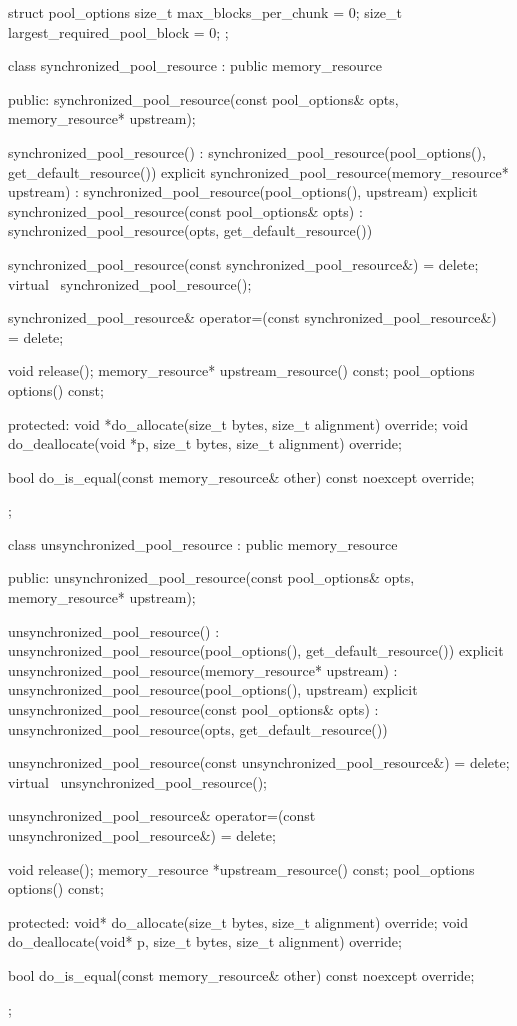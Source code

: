 %
%
%
\begin{codeblock}
struct pool_options {
  size_t max_blocks_per_chunk = 0;
  size_t largest_required_pool_block = 0;
};

class synchronized_pool_resource : public memory_resource {
public:
  synchronized_pool_resource(const pool_options& opts,
                             memory_resource* upstream);

  synchronized_pool_resource()
      : synchronized_pool_resource(pool_options(), get_default_resource()) {}
  explicit synchronized_pool_resource(memory_resource* upstream)
      : synchronized_pool_resource(pool_options(), upstream) {}
  explicit synchronized_pool_resource(const pool_options& opts)
      : synchronized_pool_resource(opts, get_default_resource()) {}

  synchronized_pool_resource(const synchronized_pool_resource&) = delete;
  virtual ~synchronized_pool_resource();

  synchronized_pool_resource&
    operator=(const synchronized_pool_resource&) = delete;

  void release();
  memory_resource* upstream_resource() const;
  pool_options options() const;

protected:
  void *do_allocate(size_t bytes, size_t alignment) override;
  void do_deallocate(void *p, size_t bytes, size_t alignment) override;

  bool do_is_equal(const memory_resource& other) const noexcept override;
};

class unsynchronized_pool_resource : public memory_resource {
public:
  unsynchronized_pool_resource(const pool_options& opts,
                               memory_resource* upstream);

  unsynchronized_pool_resource()
      : unsynchronized_pool_resource(pool_options(), get_default_resource()) {}
  explicit unsynchronized_pool_resource(memory_resource* upstream)
      : unsynchronized_pool_resource(pool_options(), upstream) {}
  explicit unsynchronized_pool_resource(const pool_options& opts)
      : unsynchronized_pool_resource(opts, get_default_resource()) {}

  unsynchronized_pool_resource(const unsynchronized_pool_resource&) = delete;
  virtual ~unsynchronized_pool_resource();

  unsynchronized_pool_resource&
    operator=(const unsynchronized_pool_resource&) = delete;

  void release();
  memory_resource *upstream_resource() const;
  pool_options options() const;

protected:
  void* do_allocate(size_t bytes, size_t alignment) override;
  void do_deallocate(void* p, size_t bytes, size_t alignment) override;

  bool do_is_equal(const memory_resource& other) const noexcept override;
};
\end{codeblock}

